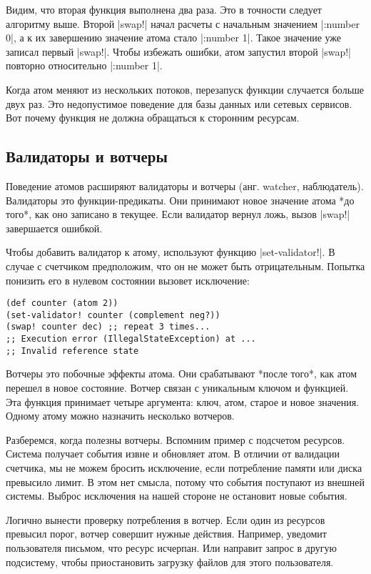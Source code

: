 Видим, что вторая функция выполнена два раза. Это в точности следует алгоритму
выше. Второй \spverb|swap!| начал расчеты с начальным значением \spverb|{:number 0}|, а к их
завершению значение атома стало \spverb|{:number 1}|. Такое значение уже записал первый
\spverb|swap!|. Чтобы избежать ошибки, атом запустил второй \spverb|swap!| повторно
относительно \spverb|{:number 1}|.

Когда атом меняют из нескольких потоков, перезапуск функции случается больше
двух раз. Это недопустимое поведение для базы данных или сетевых сервисов. Вот
почему функция не должна обращаться к сторонним ресурсам.

\subsection{Валидаторы и вотчеры}

Поведение атомов расширяют валидаторы и вотчеры (анг. watcher,
наблюдатель). Валидаторы это функции-предикаты. Они принимают новое значение
атома *до того*, как оно записано в текущее. Если валидатор вернул ложь, вызов
\spverb|swap!| завершается ошибкой.

Чтобы добавить валидатор к атому, используют функцию \spverb|set-validator!|. В случае
с счетчиком предположим, что он не может быть отрицательным. Попытка понизить
его в нулевом состоянии вызовет исключение:

\begin{verbatim}
(def counter (atom 2))
(set-validator! counter (complement neg?))
(swap! counter dec) ;; repeat 3 times...
;; Execution error (IllegalStateException) at ...
;; Invalid reference state
\end{verbatim}

Вотчеры это побочные эффекты атома. Они срабатывают *после того*, как атом
перешел в новое состояние. Вотчер связан с уникальным ключом и функцией. Эта
функция принимает четыре аргумента: ключ, атом, старое и новое значения. Одному
атому можно назначить несколько вотчеров.

Разберемся, когда полезны вотчеры. Вспомним пример с подсчетом ресурсов. Система
получает события извне и обновляет атом. В отличии от валидации счетчика, мы не
можем бросить исключение, если потребление памяти или диска превысило лимит. В
этом нет смысла, потому что события поступают из внешней системы. Выброс
исключения на нашей стороне не остановит новые события.

Логично вынести проверку потребления в вотчер. Если один из ресурсов превысил
порог, вотчер совершит нужные действия. Например, уведомит пользователя письмом,
что ресурс исчерпан. Или направит запрос в другую подсистему, чтобы
приостановить загрузку файлов для этого пользователя.

